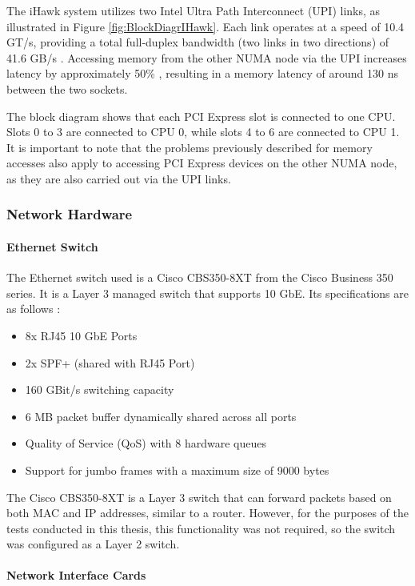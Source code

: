 The iHawk system utilizes two Intel Ultra Path Interconnect (UPI) links, as illustrated in Figure \ref{fig:BlockDiagrIHawk}. Each link operates at a speed of 10.4 GT/s, providing a total full-duplex bandwidth (two links in two directions) of 41.6 GB/s \cite{setup08}. Accessing memory from the other NUMA node via the UPI increases latency by approximately 50\% \cite{setup06}, resulting in a memory latency of around 130 ns \cite{setup07} between the two sockets.

The block diagram shows that each PCI Express slot is connected to one CPU. Slots 0 to 3 are connected to CPU 0, while slots 4 to 6 are connected to CPU 1. It is important to note that the problems previously described for memory accesses also apply to accessing PCI Express devices on the other NUMA node, as they are also carried out via the UPI links.


\subsubsection{Network Hardware}

\paragraph{Ethernet Switch} \label{chap:EthernetSwitch}
The Ethernet switch used is a Cisco CBS350-8XT from the Cisco Business 350 series. It is a Layer 3 managed switch that supports 10 GbE. Its specifications are as follows \cite{setup09}:

\begin{itemize}
\item 8x RJ45 10 GbE Ports
\item 2x SPF+ (shared with RJ45 Port)
\item 160 GBit/s switching capacity
\item 6 MB packet buffer dynamically shared across all ports
\item Quality of Service (QoS) with 8 hardware queues
\item Support for jumbo frames with a maximum size of 9000 bytes
\end{itemize}

The Cisco CBS350-8XT is a Layer 3 switch that can forward packets based on both MAC and IP addresses, similar to a router.  However, for the purposes of the tests conducted in this thesis, this functionality was not required, so the switch was configured as a Layer 2 switch.

\paragraph{Network Interface Cards} \label{chap:NicTypes}

